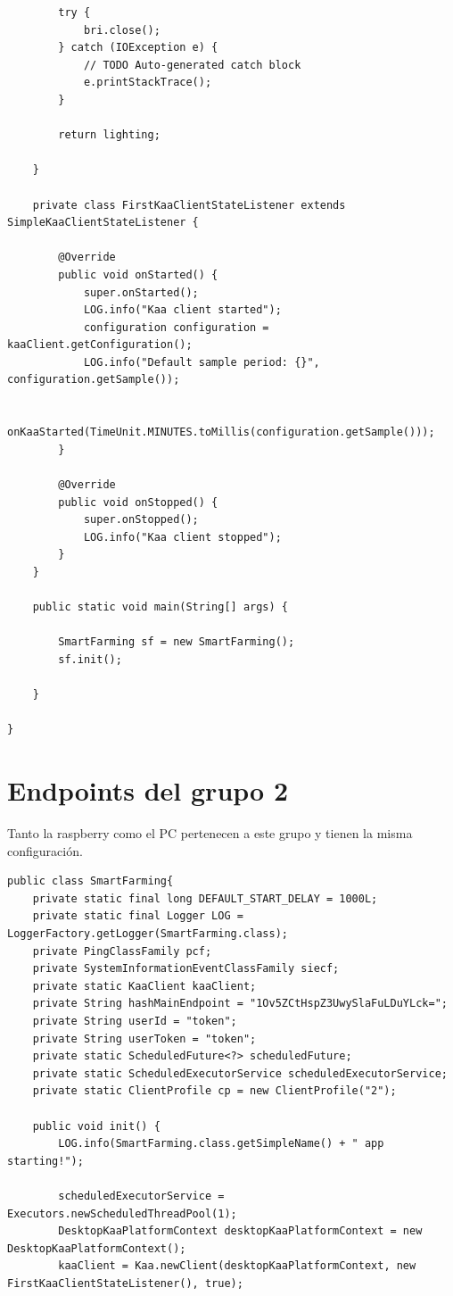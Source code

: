 \documentclass[12pt, twoside]{book}
\begin{document}
\begin{appendices}
\begin{lstlisting}
		try {
			bri.close();
		} catch (IOException e) {
			// TODO Auto-generated catch block
			e.printStackTrace();
		}

		return lighting;

	}

	private class FirstKaaClientStateListener extends SimpleKaaClientStateListener {

		@Override
		public void onStarted() {
			super.onStarted();
			LOG.info("Kaa client started");
			configuration configuration = kaaClient.getConfiguration();
			LOG.info("Default sample period: {}", configuration.getSample());

			onKaaStarted(TimeUnit.MINUTES.toMillis(configuration.getSample()));
		}

		@Override
		public void onStopped() {
			super.onStopped();
			LOG.info("Kaa client stopped");
		}
	}

	public static void main(String[] args) {

		SmartFarming sf = new SmartFarming();
		sf.init();

	}

}
\end{lstlisting}
\section{Endpoints del grupo 2}
Tanto la raspberry como el PC pertenecen a este grupo y tienen la misma configuración. 
\begin{lstlisting} 
public class SmartFarming{
	private static final long DEFAULT_START_DELAY = 1000L;
	private static final Logger LOG = LoggerFactory.getLogger(SmartFarming.class);
	private PingClassFamily pcf;
	private SystemInformationEventClassFamily siecf;
	private static KaaClient kaaClient;
	private String hashMainEndpoint = "1Ov5ZCtHspZ3UwySlaFuLDuYLck=";
	private String userId = "token";
	private String userToken = "token";
	private static ScheduledFuture<?> scheduledFuture;
	private static ScheduledExecutorService scheduledExecutorService;
	private static ClientProfile cp = new ClientProfile("2");

	public void init() {
		LOG.info(SmartFarming.class.getSimpleName() + " app starting!");

		scheduledExecutorService = Executors.newScheduledThreadPool(1);
		DesktopKaaPlatformContext desktopKaaPlatformContext = new DesktopKaaPlatformContext();
		kaaClient = Kaa.newClient(desktopKaaPlatformContext, new FirstKaaClientStateListener(), true);


\end{lstlisting}
\end{appendices}
\end{document}
